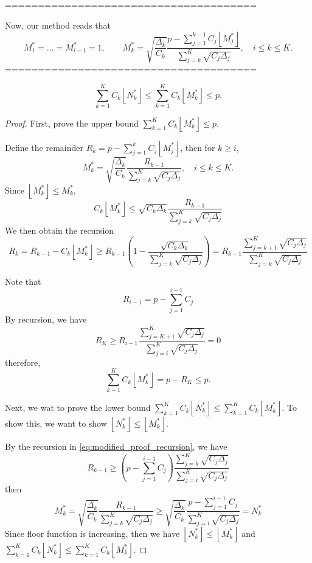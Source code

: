 ======================================

Now, our method reads that
%
\begin{equation}
    \label{eq: Modified_sample_size_iterative}
    M_1^*  = \ldots = M_{i-1}^* =1, \qquad M_k^*=\sqrt{\frac{\Delta_k}{C_k}}\frac{p-\sum_{j=1}^{k-1}C_j \left\lfloor M_j^* \right\rfloor}{\sum_{j=k}^{K}\sqrt{C_j\Delta_j}}, \quad i\le k\le K.
\end{equation}
%
======================================


\begin{theorem}
%
\[
\sum_{k=1}^K C_k\left\lfloor N_k^* \right\rfloor\le \sum_{k=1}^K C_k\left\lfloor M_k^* \right\rfloor\le p.
\]
%
\end{theorem}
\begin{proof}
    First, prove the upper bound $\sum_{k=1}^K C_k\left\lfloor M_k^* \right\rfloor\le p$.

Define the remainder $R_k = p-\sum_{j=1}^k C_j \left\lfloor M_j^* \right\rfloor$, then for $k\ge i$,
\[
M_k^*=\sqrt{\frac{\Delta_k}{C_k}}\frac{R_{k-1}}{\sum_{j=k}^{K}\sqrt{C_j\Delta_j}}, \quad i\le k\le K.
\]
Since $\left\lfloor M_k^* \right\rfloor\le M_k^*$,
\[
C_k \left\lfloor M_k^* \right\rfloor\le \sqrt{C_k\Delta_k}\frac{R_{k-1}}{\sum_{j=k}^{K}\sqrt{C_j\Delta_j}}
\]
We then obtain the recursion
\begin{equation}\label{eq:modified_proof_recursion}
    R_k = R_{k-1}-C_k  \left\lfloor M_k^* \right\rfloor\ge R_{k-1}\left(1-\frac{\sqrt{C_k\Delta_k}}{\sum_{j=k}^{K}\sqrt{C_j\Delta_j}}\right) = R_{k-1}\frac{\sum_{j=k+1}^{K}\sqrt{C_j\Delta_j}}{\sum_{j=k}^{K}\sqrt{C_j\Delta_j}}
\end{equation}


Note that
\[
R_{i-1} = p-\sum_{j=1}^{i-1}C_j
\]
By recursion, we have
\[
R_K\ge R_{i-1}\frac{\sum_{j=K+1}^{K}\sqrt{C_j\Delta_j}}{\sum_{j=i}^{K}\sqrt{C_j\Delta_j}}=0
\]
therefore, 
\begin{equation}\label{eq:modified_total_cost}
    \sum_{k-1}^K C_k\left\lfloor M_k^* \right\rfloor=p-R_K\le p.
\end{equation}


Next, we wat to prove the lower bound $\sum_{k=1}^K C_k\left\lfloor N_k^* \right\rfloor\le \sum_{k=1}^K C_k\left\lfloor M_k^* \right\rfloor$. To show this, we want to show $\left\lfloor N_k^* \right\rfloor\le \left\lfloor M_k^* \right\rfloor$.

By the recursion in \eqref{eq:modified_proof_recursion}, we have
\[
R_{k-1}\ge \left(p-\sum_{j=1}^{i-1}C_j\right)\frac{\sum_{j=k}^K \sqrt{C_j\Delta_j}}{\sum_{j=i}^K \sqrt{C_j\Delta_j}}
\]
then 
\[
M_k^* = \sqrt{\frac{\Delta_k}{C_k}}\frac{R_{k-1}}{\sum_{j=k}^{K}\sqrt{C_j\Delta_j}}\ge \sqrt{\frac{\Delta_k}{C_k}}\frac{p-\sum_{j=1}^{i-1}C_j}{\sum_{j=i}^K \sqrt{C_j\Delta_j}}=N_k^*
\]
Since floor function is increasing, then we have $\left\lfloor N_k^* \right\rfloor\le \left\lfloor M_k^* \right\rfloor$ and $\sum_{k=1}^K C_k\left\lfloor N_k^* \right\rfloor\le \sum_{k=1}^K C_k\left\lfloor M_k^* \right\rfloor$.
\end{proof}

